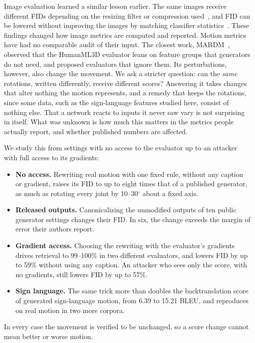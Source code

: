 \documentclass[10pt,twocolumn,letterpaper]{article}
\begin{document}
Image evaluation learned a similar lesson earlier. The same images receive different FIDs depending on the resizing filter or compression used~\cite{parmar2022}, and FID can be lowered without improving the images by matching classifier statistics~\cite{kynkaanniemi2023}. These findings changed how image metrics are computed and reported. Motion metrics have had no comparable audit of their input. The closest work, MARDM~\cite{mardm2025}, observed that the HumanML3D evaluator leans on feature groups that generators do not need, and proposed evaluators that ignore them. Its perturbations, however, also change the movement. We ask a stricter question: can the \emph{same} rotations, written differently, receive different scores? Answering it takes changes that alter nothing the motion represents, and a remedy that keeps the rotations, since some data, such as the sign-language features studied here, consist of nothing else. That a network reacts to inputs it never saw vary is not surprising in itself. What was unknown is how much this matters in the metrics people actually report, and whether published numbers are affected.

We study this from settings with no access to the evaluator up to an attacker with full access to its gradients:
\begin{itemize}
\item \textbf{No access.} Rewriting real motion with one fixed rule, without any caption or gradient, raises its FID to up to eight times that of a published generator, as much as rotating every joint by 10--30$^\circ$ about a fixed axis.
\item \textbf{Released outputs.} Canonicalizing the unmodified outputs of ten public generator settings changes their FID. In six, the change exceeds the margin of error their authors report.
\item \textbf{Gradient access.} Choosing the rewriting with the evaluator's gradients drives retrieval to 99--100\% in two different evaluators, and lowers FID by up to 59\% without using any caption. An attacker who sees only the score, with no gradients, still lowers FID by up to 57\%.
\item \textbf{Sign language.} The same trick more than doubles the backtranslation score of generated sign-language motion, from 6.39 to 15.21 BLEU, and reproduces on real motion in two more corpora.
\end{itemize}
In every case the movement is verified to be unchanged, so a score change cannot mean better or worse motion.
\end{document}
